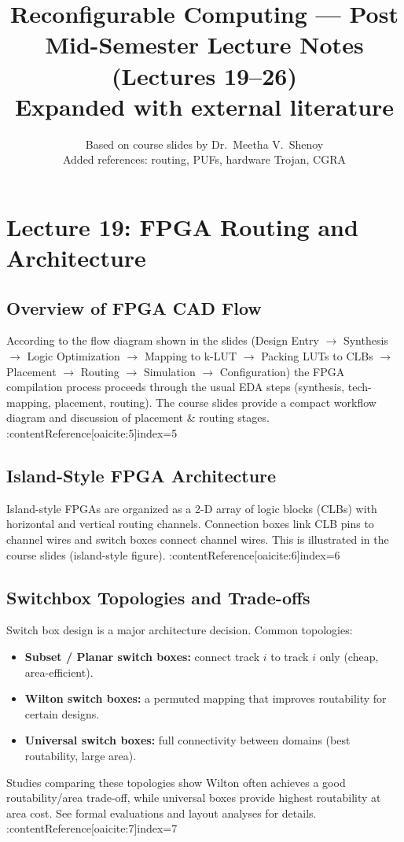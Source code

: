 \documentclass[11pt]{article}
\title{Reconfigurable Computing --- Post Mid-Semester Lecture Notes (Lectures 19--26)\\
\large Expanded with external literature}
\author{Based on course slides by Dr.~Meetha V.~Shenoy\\Added references: routing, PUFs, hardware Trojan, CGRA}
\date{}
\begin{document}
\maketitle
\tableofcontents
\newpage

\section{Lecture 19: FPGA Routing and Architecture}

\subsection{Overview of FPGA CAD Flow}
According to the flow diagram shown in the slides
(Design Entry $\rightarrow$ Synthesis $\rightarrow$ Logic Optimization $\rightarrow$ Mapping to k-LUT
$\rightarrow$ Packing LUTs to CLBs $\rightarrow$ Placement $\rightarrow$ Routing $\rightarrow$ Simulation
$\rightarrow$ Configuration)
the FPGA compilation process proceeds through the usual EDA steps (synthesis, tech-mapping, placement, routing). The course slides provide a compact workflow diagram and discussion of placement \& routing stages. :contentReference[oaicite:5]{index=5}

\subsection{Island-Style FPGA Architecture}
Island-style FPGAs are organized as a 2-D array of logic blocks (CLBs) with horizontal and vertical routing channels. Connection boxes link CLB pins to channel wires and switch boxes connect channel wires. This is illustrated in the course slides (island-style figure). :contentReference[oaicite:6]{index=6}

\subsection{Switchbox Topologies and Trade-offs}
Switch box design is a major architecture decision. Common topologies:
\begin{itemize}
  \item \textbf{Subset / Planar switch boxes:} connect track $i$ to track $i$ only (cheap, area-efficient).
  \item \textbf{Wilton switch boxes:} a permuted mapping that improves routability for certain designs.
  \item \textbf{Universal switch boxes:} full connectivity between domains (best routability, large area).
\end{itemize}
Studies comparing these topologies show Wilton often achieves a good routability/area trade-off, while universal boxes provide highest routability at area cost. See formal evaluations and layout analyses for details. :contentReference[oaicite:7]{index=7}
\end{document}
